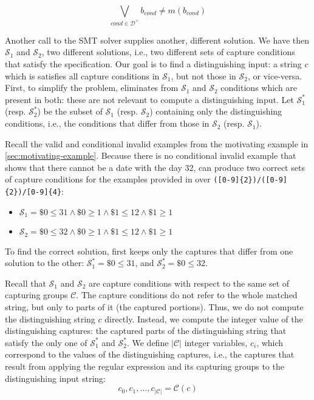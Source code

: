 \begin{equation}\label{eq:cap_cond_soft}
\bigvee_{\textit{cond} \in \mathcal{D^+}} b_{\textit{cond}} \ne m(b_{\textit{cond}})
\end{equation}

Another call to the \ac{SMT} solver supplies another, different solution. We have then \(\mathcal{S}_1\) and \(\mathcal{S}_2\), two different solutions, i.e., two different sets of capture conditions that satisfy the specification. Our goal is to find a distinguishing input: a string \(c\) which is satisfies all capture conditions in \(\mathcal{S}_1\), but not those in \(\mathcal{S}_2\), or vice-versa. First, to simplify the problem, \Forest eliminates from \(\mathcal{S}_1\) and \(\mathcal{S}_2\) conditions which are present in both: these are not relevant to compute a distinguishing input. Let \(\mathcal{S}_1^*\) (resp. \(\mathcal{S}_2^*\)) be the subset of \(\mathcal{S}_1\) (resp. \(\mathcal{S}_2\)) containing only the distinguishing conditions, i.e., the conditions that differ from those in  \(\mathcal{S}_2\) (resp. \(\mathcal{S}_1\)).

\begin{example}\label{ex:cond_cap_keep_distinct}
Recall the valid and conditional invalid examples from the motivating example in \autoref{sec:motivating-example}. Because there is no conditional invalid example that shows that there cannot be a date with the day 32, \Forest can produce two correct sets of capture conditions for the examples provided in  over \verb`([0-9]{2})/([0-9]{2})/[0-9]{4}`:
\begin{itemize}
    \item \(\mathcal{S}_1 = \$0 \le 31 \wedge \$0 \ge 1 \wedge \$1 \le 12 \wedge \$1 \ge 1\)
    \item \(\mathcal{S}_2 = \$0 \le 32 \wedge \$0 \ge 1 \wedge \$1 \le 12 \wedge \$1 \ge 1\)
\end{itemize}
To find the correct solution, \Forest first keeps only the captures that differ from one solution to the other: \(\mathcal{S}_1^* = \$0 \le 31\), and \(\mathcal{S}_2^* = \$0 \le 32\).
\end{example}

Recall that \(\mathcal{S}_1\) and \(\mathcal{S}_2\) are capture conditions with respect to the same set of capturing groups \(\mathcal{C}\). The capture conditions do not refer to the whole matched string, but only to parts of it (the captured portions). Thus, we do not compute the distinguishing string \(c\) directly. Instead, we compute the integer value of the distinguishing captures: the captured parts of the distinguishing string that satisfy the only one of \(\mathcal{S}_1^*\) and \(\mathcal{S}_2^*\).
%
We define \(|\mathcal{C}|\) integer variables, \(c_i\), which correspond to the values of the distinguishing captures, i.e., the captures that result from applying the regular expression and its capturing groups to the distinguishing input string:
%
\[c_0, c_1, ..., c_{|\mathcal{C}|} = \mathcal{C}(c)\]

